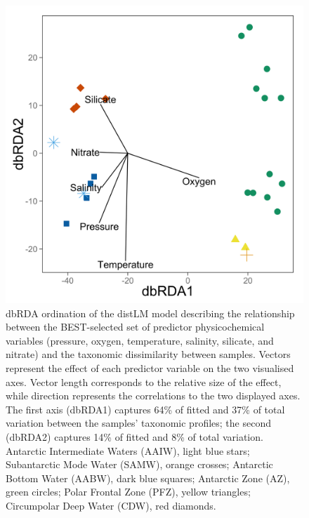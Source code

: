 \begin{figure}[!ht]
  \centering
  \includegraphics[width=\textwidth]{../advection/dbRDA.png}
  \caption[dbRDA ordination of relationship between environment and community.]{dbRDA ordination of the distLM model describing the relationship between the BEST-selected set of predictor physicochemical variables (pressure, oxygen, temperature, salinity, silicate, and nitrate) and the taxonomic dissimilarity between samples. Vectors represent the effect of each predictor variable on the two visualised axes. Vector length corresponds to the relative size of the effect, while direction represents the correlations to the two displayed axes. The first axis (dbRDA1) captures 64\% of fitted and 37\% of total variation between the samples' taxonomic profiles; the second (dbRDA2) captures 14\% of fitted and 8\% of total variation. Antarctic Intermediate Waters (AAIW), light blue stars; Subantarctic Mode Water (SAMW), orange crosses; Antarctic Bottom Water (AABW), dark blue squares; Antarctic Zone (AZ), green circles; Polar Frontal Zone (PFZ), yellow triangles; Circumpolar Deep Water (CDW), red diamonds.}
  \label{fig:dbRDA}
\end{figure}
